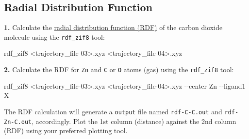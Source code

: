 \documentclass[
  letterpaper,
]{article}
\newenvironment{Shaded}{\begin{snugshade}}{\end{snugshade}}
\newcommand{\AttributeTok}[1]{\textcolor[rgb]{0.40,0.45,0.13}{#1}}
\newcommand{\ExtensionTok}[1]{\textcolor[rgb]{0.00,0.23,0.31}{#1}}
\newcommand{\NormalTok}[1]{\textcolor[rgb]{0.00,0.23,0.31}{#1}}
\newcommand{\OperatorTok}[1]{\textcolor[rgb]{0.37,0.37,0.37}{#1}}
\begin{document}
\hypertarget{radial-distribution-function}{%
\subsection*{Radial Distribution
Function}\label{radial-distribution-function}}


\textbf{1.} Calculate the
\protect\hyperlink{radial-distribution-functions-ux28rdfsux29}{radial
distribution function (RDF)} of the carbon dioxide molecule using the
\texttt{rdf\_zif8} tool:

\begin{Shaded}
\begin{Highlighting}[]
\ExtensionTok{rdf\_zif8} \OperatorTok{\textless{}}\NormalTok{trajectory\_file{-}03}\OperatorTok{\textgreater{}}\NormalTok{.xyz }\OperatorTok{\textless{}}\NormalTok{trajectory\_file{-}04}\OperatorTok{\textgreater{}}\NormalTok{.xyz}
\end{Highlighting}
\end{Shaded}

\textbf{2.} Calculate the RDF for \texttt{Zn} and \texttt{C} or
\texttt{O} atoms (gas) using the \texttt{rdf\_zif8} tool:

\begin{Shaded}
\begin{Highlighting}[]
\ExtensionTok{rdf\_zif8} \OperatorTok{\textless{}}\NormalTok{trajectory\_file{-}03}\OperatorTok{\textgreater{}}\NormalTok{.xyz }\OperatorTok{\textless{}}\NormalTok{trajectory\_file{-}04}\OperatorTok{\textgreater{}}\NormalTok{.xyz }\AttributeTok{{-}{-}center}\NormalTok{ Zn }\AttributeTok{{-}{-}ligand1}\NormalTok{ X}
\end{Highlighting}
\end{Shaded}

\begin{tcolorbox}[enhanced jigsaw, opacitybacktitle=0.6, colback=white, rightrule=.15mm, bottomrule=.15mm, coltitle=black, toprule=.15mm, bottomtitle=1mm, arc=.35mm, colframe=quarto-callout-note-color-frame, opacityback=0, toptitle=1mm, breakable, titlerule=0mm, left=2mm, title=\textcolor{quarto-callout-note-color}{\faInfo}\hspace{0.5em}{Note}, leftrule=.75mm, colbacktitle=quarto-callout-note-color!10!white]

The RDF calculation will generate a \texttt{output} file named
\texttt{rdf-C-C.out} and \texttt{rdf-Zn-C.out}, accordingly. Plot the
1st column (distance) against the 2nd column (RDF) using your preferred
plotting tool.

\end{tcolorbox}
\end{document}
